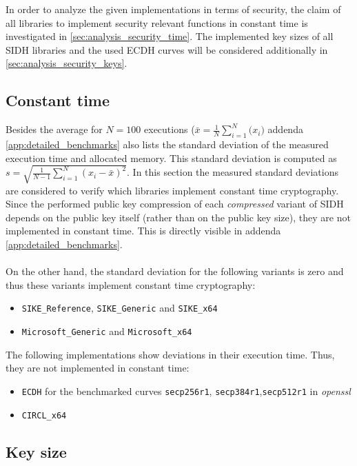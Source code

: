 In order to analyze the given implementations in terms of security, the claim of all libraries to implement security relevant functions in constant time is investigated in \autoref{sec:analysis_security_time}. The implemented key sizes of all SIDH libraries and the used ECDH curves will be considered additionally in \autoref{sec:analysis_security_keys}.

\subsection{Constant time}\label{sec:analysis_security_time}
Besides the average for $N=100$ executions ($\bar{x}=\frac{1}{N}\sum_{i=1}^N{(x_i})$ addenda \ref{app:detailed_benchmarks} also lists the standard deviation of the measured execution time and allocated memory. This standard deviation is computed as $s=\sqrt{\frac{1}{N-1}\sum_{i=1}^N(x_i-\bar{x})^2}$. In this section the measured standard deviations are considered to verify which libraries implement constant time cryptography.\\
Since the performed public key compression of each \textit{compressed} variant of SIDH depends on the public key itself (rather than on the public key size), they are not implemented in constant time. This is directly visible in  addenda \ref{app:detailed_benchmarks}.\\\\
On the other hand, the standard deviation for the following variants is zero and thus these variants implement constant time cryptography:
\begin{itemize}
\item \texttt{SIKE\_Reference}, \texttt{SIKE\_Generic} and \texttt{SIKE\_x64}
\item \texttt{Microsoft\_Generic} and \texttt{Microsoft\_x64}
\end{itemize}
The following implementations show deviations in their execution time. Thus, they are not implemented in constant time:

\begin{itemize}
\item \texttt{ECDH} for the benchmarked curves \texttt{secp256r1},  \texttt{secp384r1},\texttt{secp512r1} in \textit{openssl}
\item \texttt{CIRCL\_x64}
\end{itemize}

\subsection{Key size}\label{sec:analysis_security_keys}

